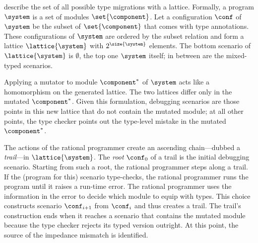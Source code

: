 
\citet{tfgnvf-popl-2016} describe the set of all possible type migrations with a
lattice. Formally, a program $\system$ is a set of modules $\set{\component}$.
Let a configuration $\conf$ of $\system$ be the subset of $\set{\component}$
that comes with type annotations. These configurations of $\system$ are ordered
by the subset relation and form a lattice $\lattice{\system}$ with
$2^{\size{\system}}$ elements. The bottom scenario of $\lattice{\system}$ is
$\emptyset$, the top one $\system$ itself; in between are the mixed-typed
scenarios.

Applying a mutator to module $\component^*$ of $\system$ acts like a homomorphism
on the generated lattice. The two lattices differ only in the mutated
$\component^*$. Given this formulation, debugging scenarios are those points in
this new lattice that do not contain the mutated module; at all other points, the type
checker points out the type-level mistake in the mutated $\component^*$.

The actions of the rational programmer create an ascending chain---dubbed a
\emph{trail}---in $\lattice{\system}$.  The {\em root\/} $\conf_0$ of a trail is
the initial debugging scenario.  Starting from such a root, the rational
programmer steps along a trail. If the (program for this) scenario type-checks,
the rational programmer runs the program until it raises a run-time error.  The
rational programmer uses the information in the error to decide which module to
equip with types. This choice constructs scenario $\conf_{i+1}$ from $\conf_{i}$
and thus creates a trail. The trail's construction ends when it reaches a
scenario that contains the mutated module because the type checker rejects its
typed version outright.  At this point, the source of the impedance mismatch is
identified.
